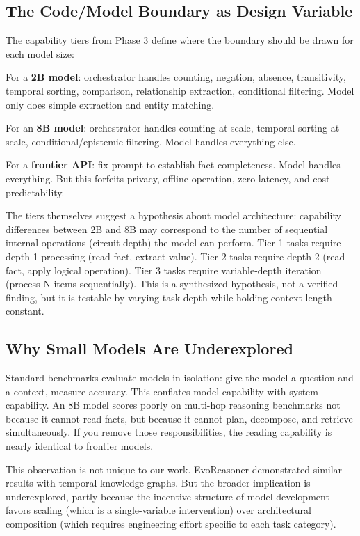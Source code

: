 \documentclass[11pt,a4paper]{article}
\begin{document}
\subsection{The Code/Model Boundary as Design Variable}

The capability tiers from Phase 3 define where the boundary should be drawn for each model size:

For a \textbf{2B model}: orchestrator handles counting, negation, absence, transitivity, temporal sorting, comparison, relationship extraction, conditional filtering. Model only does simple extraction and entity matching.

For an \textbf{8B model}: orchestrator handles counting at scale, temporal sorting at scale, conditional/epistemic filtering. Model handles everything else.

For a \textbf{frontier API}: fix prompt to establish fact completeness. Model handles everything. But this forfeits privacy, offline operation, zero-latency, and cost predictability.

The tiers themselves suggest a hypothesis about model architecture: capability differences between 2B and 8B may correspond to the number of sequential internal operations (circuit depth) the model can perform. Tier 1 tasks require depth-1 processing (read fact, extract value). Tier 2 tasks require depth-2 (read fact, apply logical operation). Tier 3 tasks require variable-depth iteration (process N items sequentially). This is a synthesized hypothesis, not a verified finding, but it is testable by varying task depth while holding context length constant.

\subsection{Why Small Models Are Underexplored}

Standard benchmarks evaluate models in isolation: give the model a question and a context, measure accuracy. This conflates model capability with system capability. An 8B model scores poorly on multi-hop reasoning benchmarks not because it cannot read facts, but because it cannot plan, decompose, and retrieve simultaneously. If you remove those responsibilities, the reading capability is nearly identical to frontier models.

This observation is not unique to our work. EvoReasoner \citep{evoreasoner2024} demonstrated similar results with temporal knowledge graphs. But the broader implication is underexplored, partly because the incentive structure of model development favors scaling (which is a single-variable intervention) over architectural composition (which requires engineering effort specific to each task category).
\end{document}
